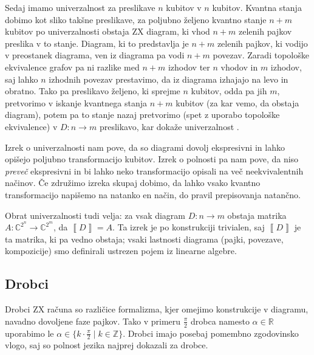 \documentclass[mat1]{fmfdelo}
\newcommand{\R}{\mathbb R}
\newcommand{\Z}{\mathbb Z}
\newcommand{\C}{\mathbb C}
\newcommand{\interpret}[1]{\left\llbracket #1 \right\rrbracket}
\begin{document}
Sedaj imamo univerzalnost za preslikave \(n\) kubitov v \(n\) kubitov. Kvantna stanja dobimo kot sliko takšne preslikave, za poljubno željeno kvantno stanje \(n+m\) kubitov po univerzalnosti obstaja ZX diagram, ki vhod \(n+m\) zelenih pajkov preslika v to stanje. Diagram, ki to predstavlja je \(n+m\) zelenih pajkov, ki vodijo v preostanek diagrama, ven iz diagrama pa vodi \(n+m\) povezav. Zaradi topološke ekvivalence grafov pa ni razlike med \(n+m\) izhodov ter \(n\) vhodov in \(m\) izhodov, saj lahko \(n\) izhodnih povezav prestavimo, da iz diagrama izhajajo na levo in obratno. Tako pa preslikavo željeno, ki sprejme \(n\) kubitov, odda pa jih \(m\), pretvorimo v iskanje kvantnega stanja \(n+m\) kubitov (za kar vemo, da obstaja diagram), potem pa to stanje nazaj pretvorimo (spet z uporabo topološke ekvivalence) v \(D:n\to m\) preslikavo, kar dokaže univerzalnost \cite[Izrek 2.18]{Coecke_2011}. \endproof

Izrek o univerzalnosti nam pove, da so diagrami dovolj ekspresivni in lahko opišejo poljubno transformacijo kubitov. Izrek o polnosti pa nam pove, da niso \emph{preveč} ekspresivni in bi lahko neko transformacijo opisali na več neekvivalentnih načinov. Če združimo izreka skupaj dobimo, da lahko vsako kvantno transformacijo napišemo na natanko en način, do pravil prepisovanja natančno.

Obrat univerzalnosti tudi velja: za vsak diagram \(D:n\to m\) obstaja matrika \(A: \C^{2^n}\to \C^{2^m}\), da \(\interpret{D}=A\). Ta izrek je po konstrukciji trivialen, saj \(\interpret{D}\) je ta matrika, ki pa vedno obstaja; vsaki lastnosti diagrama (pajki, povezave, kompozicije) smo definirali ustrezen pojem iz linearne algebre. 

\subsection{Drobci}
Drobci ZX računa so različice formalizma, kjer omejimo konstrukcije v diagramu, navadno dovoljene faze pajkov. Tako v primeru \(\frac\pi2\) drobca namesto \(\alpha\in \R\) uporabimo le \(\alpha\in\{k\cdot \frac\pi2\mid k\in\Z\}\). Drobci imajo posebaj pomembno zgodovinsko vlogo, saj so polnost jezika najprej dokazali za drobce.
\end{document}
